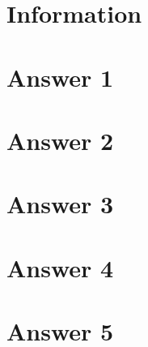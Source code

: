 \documentclass[12pt]{article}
\begin{document}
\section*{Information } 


\section*{Answer 1}


\section*{Answer 2}


\section*{Answer 3}


\section*{Answer 4}


\section*{Answer 5}
\end{document}
